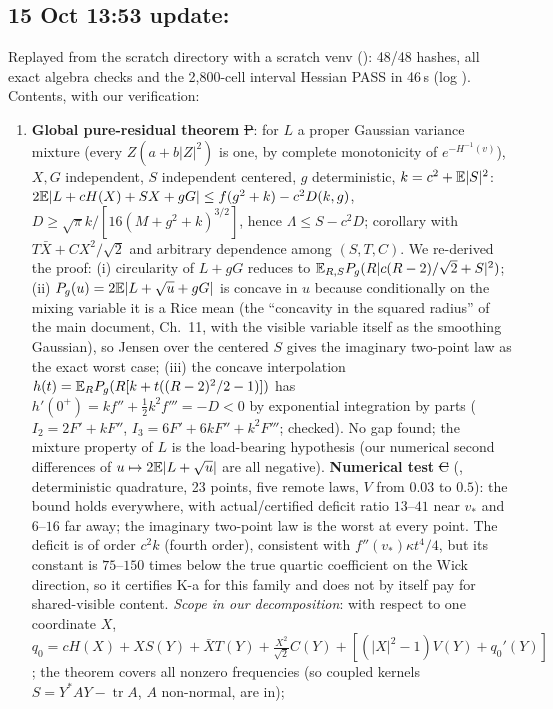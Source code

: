 \documentclass[11pt,a4paper]{article}
\begin{document}
\subsection*{15 Oct 13:53 update: }\label{sec:kfull}
Replayed from the scratch directory with a scratch venv (): 48/48 hashes, all exact algebra checks and the 2,800-cell interval Hessian PASS in 46\,s
(log ). Contents, with our verification:
\begin{enumerate}
\item \textbf{Global pure-residual theorem} \st{P}: for $L$ a proper Gaussian variance mixture (every $Z(a+b|Z|^2)$ is one, by complete monotonicity of $e^{-H^{-1}(v)}$), $X,G$ independent,
$S$ independent centered, $g$ deterministic, $k=c^2+\mathbb{E}|S|^2$: $2\mathbb{E}|L+cH(X)+SX+gG|\le f(g^2+k)-c^2D(k,g)$, $D\ge\sqrt\pi k/[16(M+g^2+k)^{3/2}]$, hence $\Lambda\le S-c^2D$; corollary with
$T\bar X+CX^2/\sqrt2$ and arbitrary dependence among $(S,T,C)$. We re-derived the proof: (i) circularity of $L+gG$ reduces to $\mathbb{E}_{R,S}P_g(R|c(R-2)/\sqrt2+S|^2)$; (ii) $P_g(u)=2\mathbb{E}|L+\sqrt u+gG|$ is
concave in $u$ because conditionally on the mixing variable it is a Rice mean (the ``concavity in the squared radius'' of the main document, Ch.~11, with the visible variable itself as the
smoothing Gaussian), so Jensen over the centered $S$ gives the imaginary two-point law as the exact worst case; (iii) the concave interpolation $h(t)=\mathbb{E}_RP_g(R[k+t((R-2)^2/2-1)])$ has
$h'(0^+)=kf''+\frac12k^2f'''=-D<0$ by exponential integration by parts ($I_2=2F'+kF''$, $I_3=6F'+6kF''+k^2F'''$; checked). No gap found; the mixture property of $L$ is the load-bearing
hypothesis (our numerical second differences of $u\mapsto2\mathbb{E}|L+\sqrt u|$ are all negative). \textbf{Numerical test} \st{C} (, deterministic quadrature, 23 points,
five remote laws, $V$ from $0.03$ to $0.5$): the bound holds everywhere, with actual/certified deficit ratio $13$--$41$ near $v_*$ and $6$--$16$ far away; the imaginary two-point law is the
worst at every point. The deficit is of order $c^2k$ (fourth order), consistent with $f''(v_*)\kappa t^4/4$, but its constant is $75$--$150$ times below the true quartic coefficient on the
Wick direction, so it certifies K-a for this family and does not by itself pay for shared-visible content. \emph{Scope in our decomposition}: with respect to one coordinate $X$,
$q_0=cH(X)+XS(Y)+\bar XT(Y)+\frac{X^2}{\sqrt2}C(Y)+[(|X|^2-1)V(Y)+q_0'(Y)]$; the theorem covers all nonzero frequencies (so coupled kernels $S=Y^*AY-\operatorname{tr}A$, $A$ non-normal, are in);

\end{enumerate}
\end{document}
